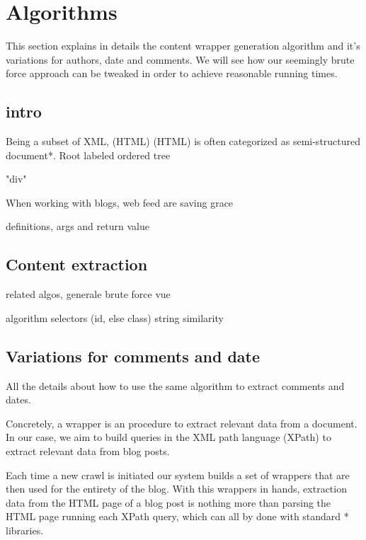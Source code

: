 \section{Algorithms}
This section explains in details the content wrapper generation algorithm and it's variations for authors, date and comments. We will see how our seemingly brute force approach can be tweaked in order to achieve reasonable running times.

\subsection{intro}
Being a subset of XML, (HTML) (HTML) is often categorized as semi-structured document*. Root labeled ordered tree

"div"

When working with blogs, web feed are saving grace 

definitions, args and return value

\subsection{Content extraction}
related algos, generale brute force vue

algorithm
selectors (id, else class)
string similarity


\subsection{Variations for comments and date}
All the details about how to use the same algorithm to extract comments and dates.



Concretely, a wrapper is an procedure to extract relevant data from a document. In our case, we aim to build queries in the XML path language (XPath) to extract relevant data from blog posts.

Each time a new crawl is initiated our system builds a set of wrappers that are then used for the entirety of the blog. With this wrappers in hands, extraction data from the HTML page of a blog post is nothing more than parsing the HTML page running each XPath query, which can all by done with standard * libraries.
